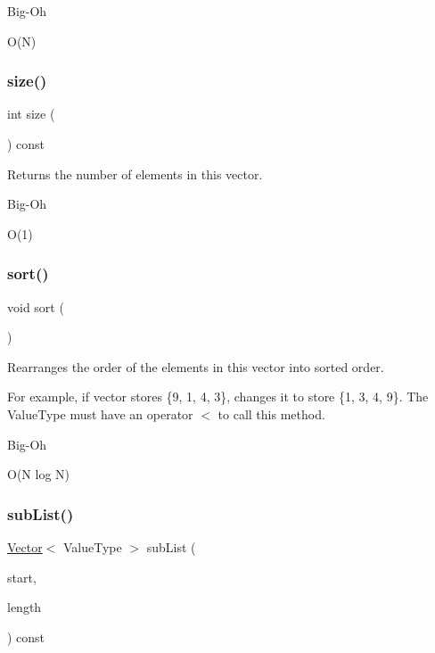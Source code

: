 \begin{DoxyRefDesc}{Big-\/\+Oh}
\item[\mbox{\hyperlink{BigOh__BigOh000130}{Big-\/\+Oh}}]O(\+N) \end{DoxyRefDesc}
\mbox{\label{classVector_af9593d4a5ff4274efaf429cb4f9e57cc}} 
\subsubsection{\texorpdfstring{size()}{size()}}
{\footnotesize\ttfamily int size (\begin{DoxyParamCaption}{ }\end{DoxyParamCaption}) const}



Returns the number of elements in this vector. 

\begin{DoxyRefDesc}{Big-\/\+Oh}
\item[\mbox{\hyperlink{BigOh__BigOh000129}{Big-\/\+Oh}}]O(1) \end{DoxyRefDesc}
\mbox{\label{classVector_a47fdc9eea42b6975cdc835bb2e08810e}} 
\subsubsection{\texorpdfstring{sort()}{sort()}}
{\footnotesize\ttfamily void sort (\begin{DoxyParamCaption}{ }\end{DoxyParamCaption})}



Rearranges the order of the elements in this vector into sorted order. 

For example, if vector stores \{9, 1, 4, 3\}, changes it to store \{1, 3, 4, 9\}. The Value\+Type must have an operator $<$ to call this method. \begin{DoxyRefDesc}{Big-\/\+Oh}
\item[\mbox{\hyperlink{BigOh__BigOh000131}{Big-\/\+Oh}}]O(\+N log N) \end{DoxyRefDesc}
\mbox{\label{classVector_a68d5113d5e35ad7906cb7d1707621e08}} 
\subsubsection{\texorpdfstring{sub\+List()}{subList()}\hspace{0.1cm}{\footnotesize\ttfamily [1/2]}}
{\footnotesize\ttfamily \mbox{\hyperlink{classVector}{Vector}}$<$ Value\+Type $>$ sub\+List (\begin{DoxyParamCaption}\item[{int}]{start,  }\item[{int}]{length }\end{DoxyParamCaption}) const}



